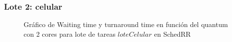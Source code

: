 \subsubsection{Lote 2: celular}

\begin{figure}[H]
\hfill
{}
\hfill
{}
\hfill
\caption{Gráfico de Waiting time y turnaround time en función del quantum con 2 cores para lote de tareas $loteCelular$ en SchedRR}
\end{figure}

